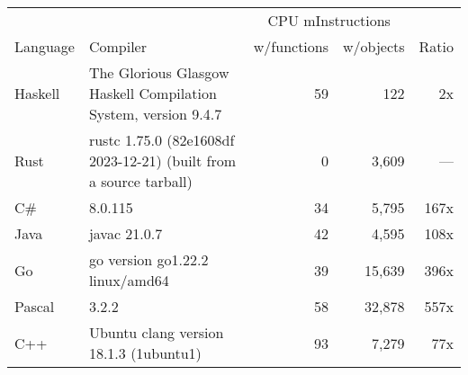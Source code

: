 \documentclass{article}
\begin{document}
      \begin{tabularx}{\linewidth}{lXrrr}
      \toprule
        & & \multicolumn{2}{c}{CPU mInstructions} & \\
        Language & Compiler & w/functions & w/objects & Ratio \\
      \midrule
    Haskell & The Glorious Glasgow Haskell Compilation System, version 9.4.7 & 59 & 122 & 2x \\
Rust & rustc 1.75.0 (82e1608df 2023-12-21) (built from a source tarball) & 0 & 3,609 & --- \\
C\# & 8.0.115 & 34 & 5,795 & 167x \\
Java & javac 21.0.7 & 42 & 4,595 & 108x \\
Go & go version go1.22.2 linux/amd64 & 39 & 15,639 & 396x \\
Pascal & 3.2.2 & 58 & 32,878 & 557x \\
C++ & Ubuntu clang version 18.1.3 (1ubuntu1) & 93 & 7,279 & 77x \\

      \bottomrule
      \end{tabularx}
      
\end{document}
